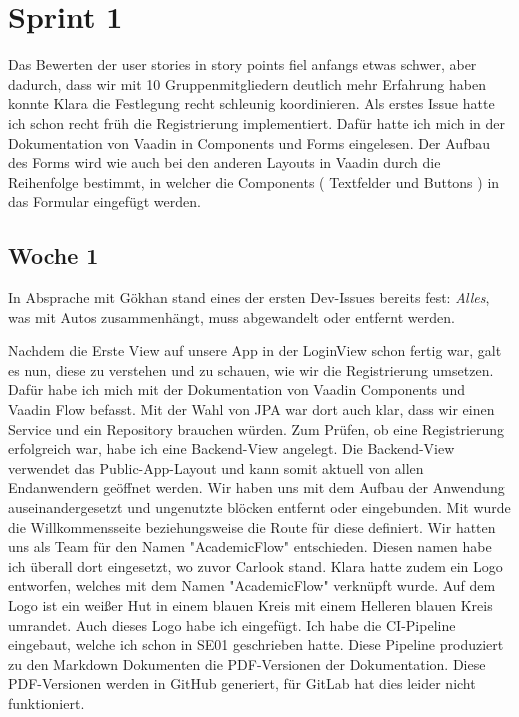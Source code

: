 

\section{Sprint 1}\label{sec:sprint1}
Das Bewerten der user stories in story points fiel anfangs etwas schwer, aber dadurch, dass wir mit 10 Gruppenmitgliedern
deutlich mehr Erfahrung haben konnte Klara die Festlegung recht schleunig koordinieren.
Als erstes Issue hatte ich schon recht früh die Registrierung implementiert.
Dafür hatte ich mich in der Dokumentation von Vaadin in Components und Forms eingelesen.
Der Aufbau des Forms wird wie auch bei den anderen Layouts in Vaadin durch die Reihenfolge bestimmt,
in welcher die Components ( Textfelder und Buttons ) in das Formular eingefügt werden.

\subsection{Woche 1}\label{subsec:woche1}
In Absprache mit Gökhan stand eines der ersten Dev-Issues bereits fest: \emph{Alles}, was mit Autos
zusammenhängt, muss abgewandelt oder entfernt werden.

Nachdem die Erste View auf unsere App in der LoginView schon fertig war, galt es nun, diese zu verstehen und zu schauen,
wie wir die Registrierung umsetzen.
Dafür habe ich mich mit der Dokumentation von Vaadin Components und Vaadin Flow befasst.
Mit der Wahl von JPA war dort auch klar, dass wir einen Service und ein Repository brauchen würden.
Zum Prüfen, ob eine Registrierung erfolgreich war, habe ich eine Backend-View angelegt.
Die Backend-View verwendet das Public-App-Layout und kann somit aktuell von allen Endanwendern
geöffnet werden.
Wir haben uns mit dem Aufbau der Anwendung auseinandergesetzt und ungenutzte blöcken entfernt oder
eingebunden.
Mit  wurde die Willkommensseite
beziehungsweise die Route für diese definiert.
Wir hatten uns als Team für den Namen "AcademicFlow" entschieden.
Diesen namen habe ich überall dort eingesetzt, wo zuvor Carlook stand.
Klara hatte zudem ein Logo entworfen, welches mit dem Namen "AcademicFlow" verknüpft wurde.
Auf dem Logo ist ein weißer Hut in einem blauen Kreis mit einem Helleren blauen
Kreis umrandet.
Auch dieses Logo habe ich eingefügt.
Ich habe die CI-Pipeline eingebaut, welche ich schon in SE01 geschrieben hatte.
Diese Pipeline produziert zu den Markdown Dokumenten die PDF-Versionen der Dokumentation.
Diese PDF-Versionen werden in GitHub generiert, für GitLab hat dies leider nicht funktioniert.
\pagebreak

